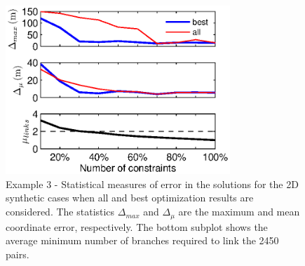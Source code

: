 \documentclass[extra, onecolumn, doublespacing]{gji}
\begin{document}
\begin{figure}
\noindent\includegraphics[width=20pc]{Figure3_c.eps}
\caption{Example 3 - Statistical measures of error in the
 solutions for the 2D synthetic cases when all and best
optimization results are considered. The statistics $\Delta_{max}$
and $\Delta_\mu$  are the maximum and mean coordinate error,
respectively. The bottom subplot shows the average minimum number of
branches required to link the 2450 pairs.}
 \label{fig:optimisationresults-2Dsynth}
\end{figure}

\end{document}
